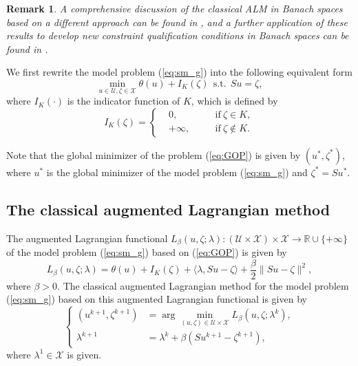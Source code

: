 \documentclass[leqno]{amsart}
\newtheorem{Remark}[Theorem]{Remark}
\theoremstyle{definition}
\begin{document}
\begin{Remark}
A comprehensive discussion of the classical ALM in Banach spaces based on a different approach can be found in \cite[Chapter 4]{steck2018lagrange}, and a further application of these results to develop new constraint qualification conditions in Banach spaces can be found in \cite{borgens2020new}.
\end{Remark}

We first rewrite the model problem (\ref{eq:sm_g}) into the following equivalent form
\begin{equation}\label{eq:GOP}
\min\limits_{u\in \mathcal{U}, \zeta\in \mathcal{X}}\theta(u) + I_K(\zeta)\ \ \mbox{s.t.}\ \ Su = \zeta,
\end{equation}
where $I_K(\cdot)$ is the indicator function of $K$, which is defined by
\begin{equation}\nonumber
I_K(\zeta) = \left\{
\begin{aligned}
&0,&\quad &\mbox{if}\ \zeta\in K,\\
&+\infty,&\quad &\mbox{if}\ \zeta\not\in K.
\end{aligned}
\right.
\end{equation}

Note that the global minimizer of the problem (\ref{eq:GOP}) is given by $(u^*, \zeta^*)$, where $u^*$ is the global minimizer of the model problem (\ref{eq:sm_g}) and $\zeta^* = Su^*$.

\subsection{The classical augmented Lagrangian method}
The augmented Lagrangian functional $L_{\beta}(u,\zeta;\lambda): (\mathcal{U}\times \mathcal{X})\times \mathcal{X}\rightarrow \mathbb{R}\cup \{+\infty\}$ of the model problem (\ref{eq:sm_g}) based on (\ref{eq:GOP}) is given by
\begin{equation}\nonumber
L_{\beta}(u,\zeta;\lambda) = \theta(u) + I_K(\zeta) + \langle\lambda, Su - \zeta \rangle + \frac{\beta}{2}\|Su - \zeta\|^2,
\end{equation}
where $\beta>0$.
The classical augmented Lagrangian method for the model problem (\ref{eq:sm_g}) based on this augmented Lagrangian functional is given by
\begin{equation}\label{eq:ALM}
\left\{
\begin{aligned}
(u^{k+1}, \zeta^{k+1}) & = \arg\min\limits_{(u,\zeta)\in\mathcal{U}\times \mathcal{X}}L_{\beta}(u, \zeta;\lambda^k),\\
\lambda^{k+1} & = \lambda^k + \beta(Su^{k+1} - \zeta^{k+1}),
\end{aligned}
\right.
\end{equation}
where $\lambda^1\in \mathcal{X}$ is given.
\end{document}
